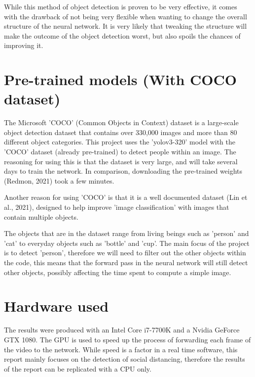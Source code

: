 \documentclass[12pt]{report}
\begin{document}
\vspace{2mm}

While this method of object detection is proven to be very effective, it comes with the drawback of not being very flexible when wanting to change the overall structure of the neural network. It is very likely that tweaking the structure will make the outcome of the object detection worst, but also spoils the chances of improving it.

\section{Pre-trained models (With COCO dataset)}

The Microsoft 'COCO' (Common Objects in Context) dataset is a large-scale object detection dataset that contains over 330,000 images and more than 80 different object categories. This project uses the 'yolov3-320' model with the 'COCO' dataset (already pre-trained) to detect people within an image. The reasoning for using this is that the dataset is very large, and will take several days to train the network. In comparison, downloading the pre-trained weights (Redmon, 2021) took a few minutes. 

\vspace{2mm}

Another reason for using 'COCO' is that it is a well documented dataset (Lin et al., 2021), designed to help improve 'image classification' with images that contain multiple objects.

\vspace{2mm}

The objects that are in the dataset range from living beings such as 'person' and 'cat' to everyday objects such as 'bottle' and 'cup'. The main focus of the project is to detect 'person', therefore we will need to filter out the other objects within the code, this means that the forward pass in the neural network will still detect other objects, possibly affecting the time spent to compute a simple image. 

\section{Hardware used}

The results were produced with an Intel Core i7-7700K and a Nvidia GeForce GTX 1080. The GPU is used to speed up the process of forwarding each frame of the video to the network. While speed is a factor in a real time software, this report mainly focuses on the detection of social distancing, therefore the results of the report can be replicated with a CPU only.
\end{document}
